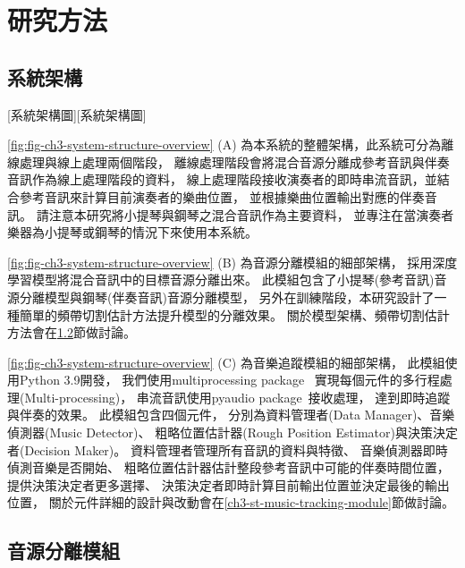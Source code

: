 \documentclass[class=NCU_thesis, crop=false]{standalone}
\begin{document}
\chapter{研究方法}

\section{系統架構} \label{ch3-st-system-structure}
[系統架構圖][系統架構圖]

\cref{fig:fig-ch3-system-structure-overview} (A)
為本系統的整體架構，此系統可分為離線處理與線上處理兩個階段，
離線處理階段會將混合音源分離成參考音訊與伴奏音訊作為線上處理階段的資料，
線上處理階段接收演奏者的即時串流音訊，並結合參考音訊來計算目前演奏者的樂曲位置，
並根據樂曲位置輸出對應的伴奏音訊。
請注意本研究將小提琴與鋼琴之混合音訊作為主要資料，
並專注在當演奏者樂器為小提琴或鋼琴的情況下來使用本系統。

\cref{fig:fig-ch3-system-structure-overview} (B)
為音源分離模組的細部架構，
採用深度學習模型將混合音訊中的目標音源分離出來。
此模組包含了小提琴(參考音訊)音源分離模型與鋼琴(伴奏音訊)音源分離模型，
另外在訓練階段，本研究設計了一種簡單的頻帶切割估計方法提升模型的分離效果。
關於模型架構、頻帶切割估計方法會在\ref{ch3-st-mss-module}節做討論。

\cref{fig:fig-ch3-system-structure-overview} (C)
為音樂追蹤模組的細部架構，
此模組使用Python 3.9開發，
我們使用multiprocessing package~\cite{python2024multiprocessing}
實現每個元件的多行程處理(Multi-processing)，
串流音訊使用pyaudio package~\cite{python2024pyaudio}接收處理，
達到即時追蹤與伴奏的效果。
此模組包含四個元件，
分別為資料管理者(Data Manager)、音樂偵測器(Music Detector)、
粗略位置估計器(Rough Position Estimator)與決策決定者(Decision Maker)。
資料管理者管理所有音訊的資料與特徵、
音樂偵測器即時偵測音樂是否開始、
粗略位置估計器估計整段參考音訊中可能的伴奏時間位置，提供決策決定者更多選擇、
決策決定者即時計算目前輸出位置並決定最後的輸出位置，
關於元件詳細的設計與改動會在\ref{ch3-st-music-tracking-module}節做討論。

\pagebreak

\section{音源分離模組} \label{ch3-st-mss-module}
\end{document}
